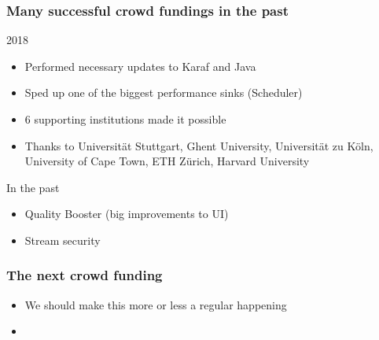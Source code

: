 \documentclass[t,aspectratio=43]{beamer}
\begin{document}
\begin{frame}[c]
  \frametitle{Many successful crowd fundings in the past}
  2018
  \begin{itemize}
    \item Performed necessary updates to Karaf and Java
    \item Sped up one of the biggest performance sinks (Scheduler)
    \item 6 supporting institutions made it possible
    \item Thanks to Universität Stuttgart, Ghent University, Universität zu Köln, University of Cape Town, ETH Zürich, Harvard University
  \end{itemize}
  In the past
  \begin{itemize}
    \item Quality Booster (big improvements to UI)
    \item Stream security
  \end{itemize}
\end{frame}

\begin{frame}[c]
  \frametitle{The next crowd funding}
  \begin{itemize}
    \item We should make this more or less a regular happening
    \item 
  \end{itemize}
\end{frame}
\end{document}
